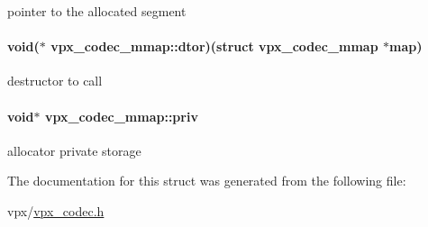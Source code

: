 pointer to the allocated segment \hypertarget{structvpx__codec__mmap_a39476b4d60e41d0867e0966f09dc1e45}{
\paragraph[{dtor}]{\setlength{\rightskip}{0pt plus 5cm}void($\ast$ {\bf vpx\-\_\-codec\-\_\-mmap\-::dtor})(struct {\bf vpx\-\_\-codec\-\_\-mmap} $\ast$map)}}\label{structvpx__codec__mmap_a39476b4d60e41d0867e0966f09dc1e45}
destructor to call \hypertarget{structvpx__codec__mmap_ac2be21bb5e6d94332fff9c5f1263224f}{
\paragraph[{priv}]{\setlength{\rightskip}{0pt plus 5cm}void$\ast$ {\bf vpx\-\_\-codec\-\_\-mmap\-::priv}}}\label{structvpx__codec__mmap_ac2be21bb5e6d94332fff9c5f1263224f}
allocator private storage 

\-The documentation for this struct was generated from the following file\-:\begin{DoxyCompactItemize}
\item 
vpx/\hyperlink{vpx__codec_8h}{vpx\-\_\-codec.\-h}\end{DoxyCompactItemize}
